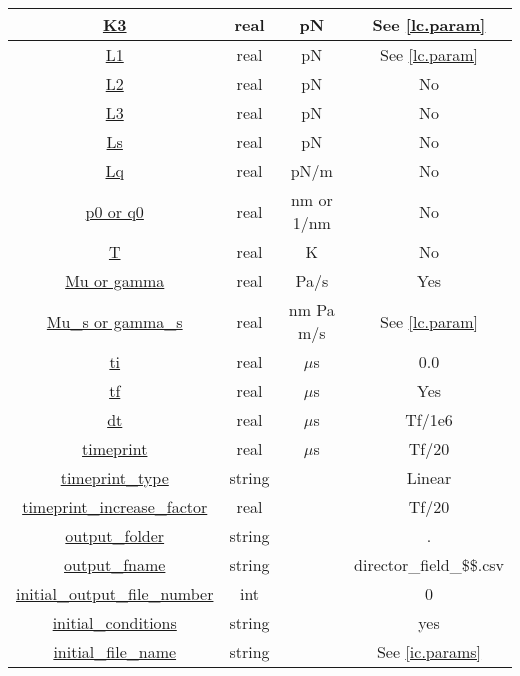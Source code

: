 \documentclass{article}
\begin{document}
\begin{center}
\begin{longtable}{|c|c|c|c|}
          \hline
          \hyperref[lc.param]{K3} & real &  pN  &  See \ref{lc.param}\\ 
          \hline 
          \hyperref[lc.param]{L1} & real &  pN & See \ref{lc.param}\\ 
          \hline 
          \hyperref[lc.param]{L2} & real &  pN & No   \\ 
          \hline
          \hyperref[lc.param]{ L3} & real & pN & No   \\ 
          \hline
          \hyperref[lc.param]{ Ls} & real & pN & No   \\ 
          \hline
          \hyperref[lc.param]{ Lq} & real & pN/m & No   \\ 
          \hline 
          \hyperref[lc.param]{p0 or q0} & real & nm or 1/nm & No \\ 
          \hline
          \hyperref[lc.param]{T}  & real & K	& No \\ 
          \hline 
          \hyperref[lc.param]{Mu or gamma} & real & Pa/s & Yes \\ 
          \hline 
          \hyperref[lc.param]{Mu\_s or gamma\_s} & real & nm Pa m/s&  See \ref{lc.param}\\ 
          \hline 
          \hyperref[time.param]{ti}& real & $\mu$s  & 0.0 \\ 
          \hline 
          \hyperref[time.param]{tf}& real & $\mu$s  & Yes\\ 
          \hline 
          \hyperref[time.param]{dt}& real & $\mu$s  & Tf/1e6 \\ 
          \hline 
          \hyperref[snapshot.param]{timeprint}& real & $\mu$s &  Tf/20 \\ 
          \hline 
          \hyperref[snapshot.param]{timeprint\_type}& string &  & Linear\\ 
          \hline 
          \hyperref[snapshot.param]{timeprint\_increase\_factor}& real&   & Tf/20 \\ 
          \hline 
          \hyperref[snapshot.param]{output\_folder}&	string & & . \\ 
          \hline 
          \hyperref[snapshot.param]{output\_fname}&	string & & director\_field\_\$\$.csv \\ 
          \hline 
          \hyperref[snapshot.param]{initial\_output\_file\_number} & int & & 0 \\ 
          \hline 
          \hyperref[ic.param]{initial\_conditions} & string & & yes \\ 
          \hline 
          \hyperref[ic.param]{initial\_file\_name} & string & & See \ref{ic.params} \\ 

\end{longtable}
\end{center}
\end{document}
